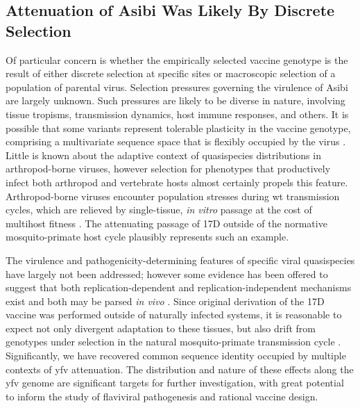 \subsection{Attenuation of Asibi Was Likely By Discrete Selection}
Of particular concern is whether the empirically selected vaccine genotype is the result of either discrete selection at specific sites or macroscopic selection of a population of parental virus. Selection pressures governing the virulence of Asibi are largely unknown. Such pressures are likely to be diverse in nature, involving tissue tropisms, transmission dynamics, host immune responses, and others. It is possible that some variants represent tolerable plasticity in the vaccine genotype, comprising a multivariate sequence space that is flexibly occupied by the virus \parencite{Vignuzzi:2006ju}. Little is known about the adaptive context of quasispecies distributions in arthropod-borne viruses, however selection for phenotypes that productively infect both arthropod and vertebrate hosts almost certainly propels this feature. Arthropod-borne viruses encounter population stresses during \gls{wt} transmission cycles, which are relieved by single-tissue, \emph{in vitro} passage at the cost of multihost fitness \parencite{Ebel:2011do,Coffey:2008jq}. The attenuating passage of 17D outside of the normative mosquito-primate host cycle plausibly represents such an example.

The virulence and pathogenicity-determining features of specific viral quasispecies have largely not been addressed; however some evidence has been offered to suggest that both replication-dependent and replication-independent mechanisms exist and both may be parsed \emph{in vivo} \parencite{Lancaster:2011hf}. Since original derivation of the 17D vaccine was performed outside of naturally infected systems, it is reasonable to expect not only divergent adaptation to these tissues, but also drift from genotypes under selection in the natural mosquito-primate transmission cycle \parencite{Coffey:2011ba,Coffey:2008jq}. Significantly, we have recovered common sequence identity occupied by multiple contexts of \gls{yfv} attenuation. The distribution and nature of these effects along the \gls{yfv} genome are significant targets for further investigation, with great potential to inform the study of flaviviral pathogenesis and rational vaccine design.
\clearpage


